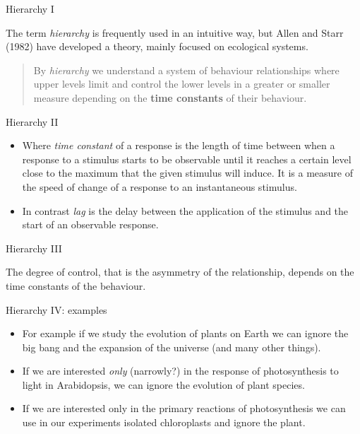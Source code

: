 \documentclass[10pt]{beamer}
\begin{document}
\begin{frame}{Hierarchy I}

The term \textit{hierarchy} is frequently used in an intuitive way,
but Allen and Starr (1982) have developed a theory, mainly focused
on ecological systems.

\begin{quotation}
By \textit{hierarchy} we understand a system of behaviour
relationships where upper levels limit and control the lower levels
in a greater or smaller measure depending on the \textbf{time
constants} of their behaviour.
\end{quotation}

\end{frame}

\begin{frame}{Hierarchy II}
\begin{itemize}
\item<1> Where \textit{time constant} of a response is the length of time
between when a response to a stimulus starts to be observable until
it reaches a certain level close to the maximum that the given
stimulus will induce. It is a measure of the speed of change of a
response to an instantaneous stimulus.

\item<2> In contrast \textit{lag} is the delay between the application of
the stimulus and the start of an observable response.
\end{itemize}
\end{frame}

\begin{frame}{Hierarchy III}

The degree of control, that is the asymmetry of the relationship,
depends on the time constants of the behaviour.

  

 \DExamples{}

\end{frame}

\begin{frame}{Hierarchy IV: examples}
\begin{itemize}
\item For example if we study the evolution of plants on Earth we can
ignore the big bang and the expansion of the universe (and many
other things).

\item If we are interested \emph{only} (narrowly?) in the response of photosynthesis to light
in Arabidopsis, we can ignore the evolution of plant species.

\item If we are interested only in the primary reactions of photosynthesis
we can use in our experiments isolated chloroplasts and ignore the
plant.
\end{itemize}
\end{frame}
\end{document}
